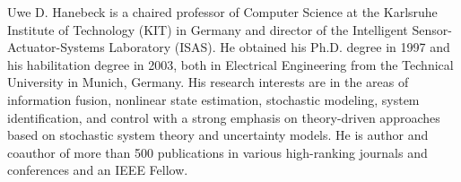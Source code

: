 \documentclass[10pt,letterpaper,oneside,twocolumn,journal]{IEEEtran}
\theoremstyle{definition}
\theoremstyle{definition}
\theoremstyle{remark}
\begin{document}
\vspace{-2\baselineskip}
\begin{IEEEbiography}{Uwe D. Hanebeck}
is a chaired professor of Computer Science at the Karlsruhe Institute of Technology (KIT) in Germany and director of the Intelligent Sensor-Actuator-Systems Laboratory (ISAS). He obtained his Ph.D. degree in 1997 and his habilitation degree in 2003, both in Electrical Engineering from the Technical University in Munich, Germany. His research interests are in the areas of information fusion, nonlinear state estimation, stochastic modeling, system identification, and control with a strong emphasis on theory-driven approaches based on stochastic system theory and uncertainty models. He is author and coauthor of more than 500 publications in various high-ranking journals and conferences and an IEEE Fellow.
\end{IEEEbiography}




\end{document}
